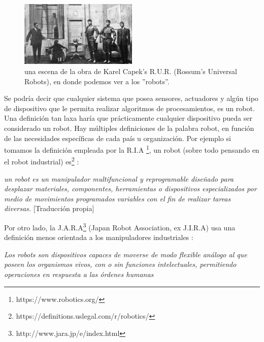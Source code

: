 \begin{figure}
  \begin{center}
    \includegraphics[width=0.5\textwidth]{figuras/Capek_play.jpg}
    \caption[Caption for LOF]{una escena de la obra de Karel Capek's R.U.R. (Rossum's Universal Robots), en donde podemos ver a los ''robots''.}
       
    \label{fig:reprap }
  \end{center}
\end{figure}

Se podría decir que cualquier sistema que posea sensores, actuadores y algún tipo de dispositivo que le permita realizar algoritmos de procesamientos, es un robot. Una definición tan laxa haría que prácticamente cualquier dispositivo pueda ser considerado un robot. Hay múltiples definiciones de la palabra robot, en función de las necesidades específicas de cada país u organización. Por ejemplo si tomamos la definición empleada por la R.I.A \footnote{https://www.robotics.org/}, un robot (sobre todo pensando en el robot industrial) es\footnote{https://definitions.uslegal.com/r/robotics/} : 
  

\begin{center}
\textit{un robot es un manipulador multifuncional y reprogramable diseñado para desplazar materiales, componentes, herramientas o dispositivos especializados por medio de movimientos programados variables con el fin de realizar tareas diversas.} [Traducción propia]
\end{center}

Por otro lado, la J.A.R.A\footnote{http://www.jara.jp/e/index.html} (Japan Robot Association, ex J.I.R.A) usa una definición menos orientada a los manipuladores industriales \citep{reyes_cortes_robotica:_2011}:

\begin{center}
\textit{Los robots son dispositivos capaces de moverse de modo flexible análogo al que poseen los organismos vivos, con o sin funciones intelectuales, permitiendo operaciones en respuesta a las órdenes humanas}
\end{center}

